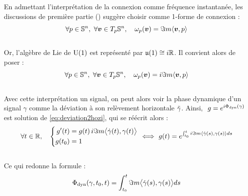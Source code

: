 En admettant l'interprétation de la connexion comme fréquence instantanée, les discussions de première partie () suggère choisir comme 1-forme de connexion :
\[\forall p\in\S{n},\ \forall \bf{v}\in\tg[p]{\S{n}},\quad \conn_p(\bf{v}) = \Im m \langle \bf{v}, p\rangle\]
\\
Or, l'algèbre de Lie de $\U{1}$ est représenté par $\mathfrak{u}(1)\cong i\R$. Il convient alors de poser :
\begin{equation} \label{eq:conn2SUPC}
	\forall p\in\S{n},\ \forall \bf{v}\in\tg[p]{\S{n}},\quad \conn_p(\bf{v}) = i\Im m \langle \bf{v}, p\rangle
\end{equation}
\\
Avec cette interprétation un signal, on peut alors voir la phase dynamique d'un signal $\gamma$ comme la déviation à son relèvement horizontale $\Tilde{\gamma}$. Ainsi, $\ g = e^{i\phased(\gamma)}\ $ est solution de \eqref{eq:deviation2hozi}, qui se réécrit alors :
\[\forall t\in\R,\quad \left\{ \begin{aligned}
	g'(t)  &= g(t)\, i\Im m \big\langle \dot{\gamma}(t) , \gamma(t) \big\rangle \\
	g(t_0) &= 1
\end{aligned}\ \right. \Llr\ g(t) = e^{\int_{t_0}^t i\Im m\langle \dot{\gamma}(s) , \gamma(s) \rangle ds}\]
\\
Ce qui redonne la formule :
\begin{equation}\label{eq:phased_vgeodiff}
	\phased(\gamma, t_0, t) = \int_{t_0}^t \Im m\big\langle \dot{\gamma}(s) , \gamma(s) \big\rangle ds
\end{equation}
\\

